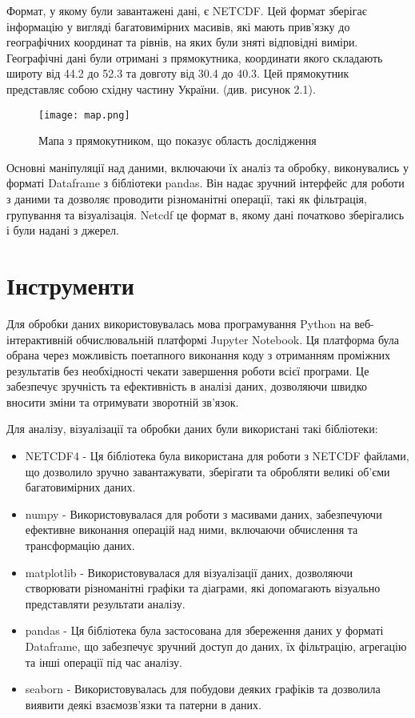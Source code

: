 Формат, у якому були завантажені дані, є NETCDF. 
Цей формат зберігає інформацію у вигляді багатовимірних масивів, які мають прив'язку до географічних координат та рівнів, на яких були зняті відповідні виміри. 
Географічні дані були отримані з прямокутника, координати якого складають широту від 44.2 до 52.3 та довготу від 30.4 до 40.3. Цей прямокутник представляє собою східну частину України. (див. рисунок 2.1).

\begin{figure}[h]
    \begin{center}
        \texttt{[image: map.png]}
        \caption{Мапа з прямокутником, що показує область дослідження}
    \end{center}
\end{figure}

Основні маніпуляції над даними, включаючи їх аналіз та обробку, виконувались у форматі Dataframe з бібліотеки pandas. 
Він надає зручний інтерфейс для роботи з даними та дозволяє проводити різноманітні операції, такі як фільтрація, групування та візуалізація. 
Netcdf це формат в, якому дані початково зберігались і були надані з джерел.


\section{Інструменти}

Для обробки даних використовувалась мова програмування Python на веб-інтерактивній обчислювальній платформі Jupyter Notebook. 
Ця платформа була обрана через можливість поетапного виконання коду з отриманням проміжних результатів без необхідності чекати завершення роботи всієї програми. 
Це забезпечує зручність та ефективність в аналізі даних, дозволяючи швидко вносити зміни та отримувати зворотній зв'язок.

Для аналізу, візуалізації та обробки даних були використані такі бібліотеки:

\begin{itemize}
    \item NETCDF4 - Ця бібліотека була використана для роботи з NETCDF файлами, що дозволило зручно завантажувати, зберігати та обробляти великі об'єми багатовимірних даних.
    \item numpy - Використовувалася для роботи з масивами даних, забезпечуючи ефективне виконання операцій над ними, включаючи обчислення та трансформацію даних.
    \item matplotlib - Використовувалася для візуалізації даних, дозволяючи створювати різноманітні графіки та діаграми, які допомагають візуально представляти результати аналізу.
    \item pandas - Ця бібліотека була застосована для збереження даних у форматі Dataframe, що забезпечує зручний доступ до даних, їх фільтрацію, агрегацію та інші операції під час аналізу.
    \item seaborn - Використовувалась для побудови деяких графіків та дозволила виявити деякі взаємозв’язки та патерни в даних.
\end{itemize}

